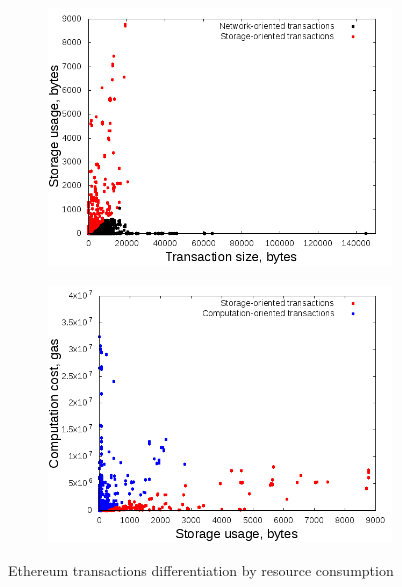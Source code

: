 \documentclass[]{llncs}   %
\begin{document}
\begin{figure}[h]
    \begin{subfigure}[b]{0.48\textwidth}
        \includegraphics[width=\textwidth]{figures/txs-size-storage}
        \caption{}
        \label{fig:a}
    \end{subfigure}
    \begin{subfigure}[b]{0.48\textwidth}
        \includegraphics[width=\textwidth]{figures/txs-storage-computation}
        \caption{}
        \label{fig:b}
    \end{subfigure}

    \caption{Ethereum transactions differentiation by resource consumption}\label{fig:animals}
\end{figure}
\end{document}
